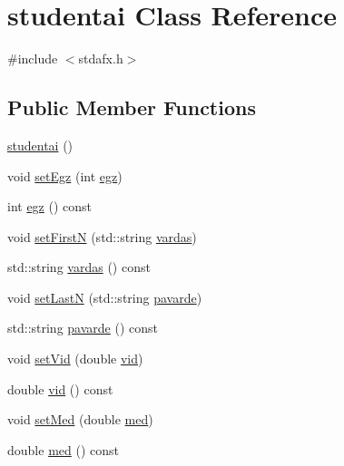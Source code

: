 \hypertarget{classstudentai}{}\section{studentai Class Reference}
\label{classstudentai}


{\ttfamily \#include $<$stdafx.\+h$>$}

\subsection*{Public Member Functions}
\begin{DoxyCompactItemize}
\item 
\mbox{\hyperlink{classstudentai_a60b1c161d9a3ba14298ecc0b126a4368}{studentai}} ()
\item 
void \mbox{\hyperlink{classstudentai_a10215f49f69a1148944514a4fc9cc85e}{set\+Egz}} (int \mbox{\hyperlink{classstudentai_a5bcdc07aacdebaf33b4bfbd6329011b2}{egz}})
\item 
int \mbox{\hyperlink{classstudentai_a5bcdc07aacdebaf33b4bfbd6329011b2}{egz}} () const
\item 
void \mbox{\hyperlink{classstudentai_aaf16dbbb2208e3392bbf94afc6820c4f}{set\+FirstN}} (std\+::string \mbox{\hyperlink{classstudentai_a1f2a1e52de5772857f8c85a29fdaea78}{vardas}})
\item 
std\+::string \mbox{\hyperlink{classstudentai_a1f2a1e52de5772857f8c85a29fdaea78}{vardas}} () const
\item 
void \mbox{\hyperlink{classstudentai_a4f5899eb5c1cf528141e4c238c26cd22}{set\+LastN}} (std\+::string \mbox{\hyperlink{classstudentai_a5096a46bb2a2a1bdbc41b3fb89417fa5}{pavarde}})
\item 
std\+::string \mbox{\hyperlink{classstudentai_a5096a46bb2a2a1bdbc41b3fb89417fa5}{pavarde}} () const
\item 
void \mbox{\hyperlink{classstudentai_a3f27169af9f9f7e9f813374b373e979b}{set\+Vid}} (double \mbox{\hyperlink{classstudentai_ab58ca300910c5cb8acd808e30bf8779c}{vid}})
\item 
double \mbox{\hyperlink{classstudentai_ab58ca300910c5cb8acd808e30bf8779c}{vid}} () const
\item 
void \mbox{\hyperlink{classstudentai_a69c08f216ba9ea7609772e44c80c4cd7}{set\+Med}} (double \mbox{\hyperlink{classstudentai_ae448b8ec1c5d99c6f6313f7e4a12ed14}{med}})
\item 
double \mbox{\hyperlink{classstudentai_ae448b8ec1c5d99c6f6313f7e4a12ed14}{med}} () const
\item 

\end{DoxyCompactItemize}
